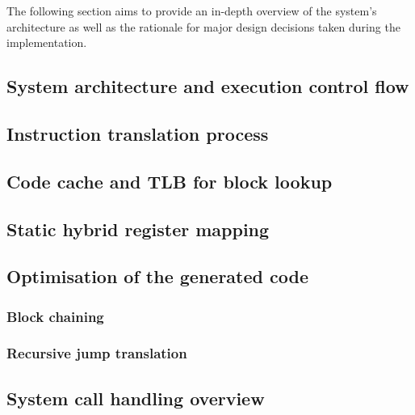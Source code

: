 The following section aims to provide an in-depth overview of the system's architecture as well as the rationale for major design decisions taken during the implementation.

\subsection{System architecture and execution control flow}

\subsection{Instruction translation process}

\subsection{Code cache and TLB for block lookup}

\subsection{Static hybrid register mapping}

\subsection{Optimisation of the generated code}
\subsubsection{Block chaining}
\subsubsection{Recursive jump translation}

\subsection{System call handling overview}
